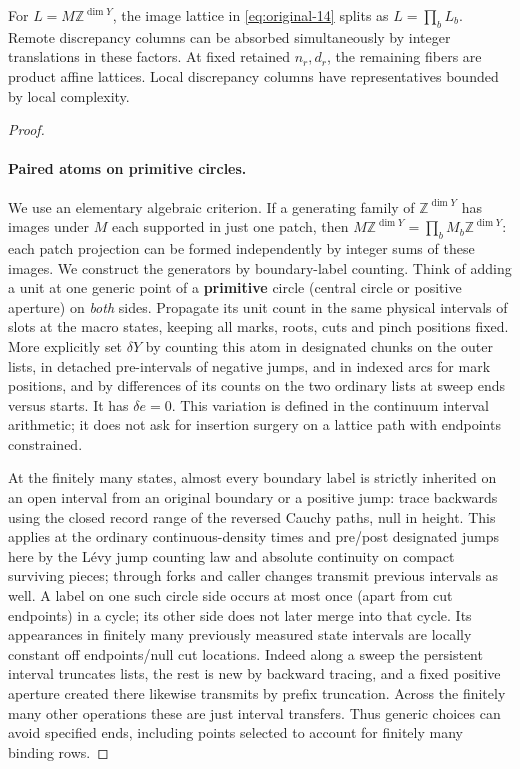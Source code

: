 \begin{lemma}\label{kern:integer-splitting}
For \(L=M\mathbb Z^{\dim Y}\), the image lattice in \eqref{eq:original-14} splits as
\(L=\prod_b L_b\). Remote discrepancy columns can be absorbed simultaneously by integer
translations in these factors. At fixed retained \(n_r,d_r\), the remaining fibers are product
affine lattices. Local discrepancy columns have representatives bounded by local complexity.
\end{lemma}
\begin{proof}\leavevmode

\paragraph{Paired atoms on primitive circles.}

We use an elementary algebraic criterion. If a generating family of
$\mathbb Z^{\dim Y}$ has images under $M$ each supported in just one patch,
then $M\mathbb Z^{\dim Y}=\prod_b M_b\mathbb Z^{\dim Y}$: each patch
projection can be formed independently by integer sums of these images.
We construct the generators by boundary-label counting. Think of adding a unit
at one generic point of a \textbf{primitive} circle
(central circle or positive aperture) on \emph{both} sides. Propagate its unit count in the same physical
intervals of slots at the macro states, keeping all marks, roots, cuts and pinch positions fixed. More
explicitly set \(\delta Y\) by counting this atom in designated chunks on the outer lists, in detached
pre-intervals of negative jumps, and in indexed arcs for mark positions, and by differences of its counts on
the two ordinary lists at sweep ends versus starts. It has \(\delta e=0\). This variation is defined in the
continuum interval arithmetic; it does not ask for insertion surgery on a lattice path with endpoints
constrained.

At the finitely many states, almost every boundary label is strictly inherited on an open interval from
an original boundary or a positive jump: trace backwards using the closed record range of the reversed
Cauchy paths, null in height. This applies at the ordinary continuous-density times and pre/post designated
jumps here by the Lévy jump counting law and absolute continuity on compact surviving pieces; through forks
and caller changes transmit previous intervals as well. A label on one such circle side occurs at most once
(apart from cut endpoints) in a cycle; its other side does not later merge into that cycle. Its appearances
in finitely many previously measured state intervals are locally constant off endpoints/null cut locations.
Indeed along a sweep the persistent interval truncates lists, the rest is new by backward tracing, and a
fixed positive aperture created there likewise transmits by prefix truncation. Across the finitely many
other operations these are just interval transfers. Thus generic choices can avoid specified ends, including
points selected to account for finitely many binding rows.


\end{proof}
